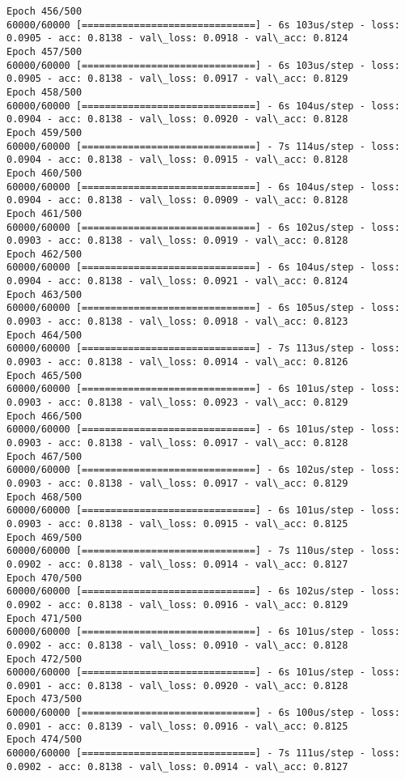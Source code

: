 \documentclass[11pt]{article}
\begin{document}
\begin{Verbatim}[commandchars=\\\{\}]
Epoch 456/500
60000/60000 [==============================] - 6s 103us/step - loss: 0.0905 - acc: 0.8138 - val\_loss: 0.0918 - val\_acc: 0.8124
Epoch 457/500
60000/60000 [==============================] - 6s 103us/step - loss: 0.0905 - acc: 0.8138 - val\_loss: 0.0917 - val\_acc: 0.8129
Epoch 458/500
60000/60000 [==============================] - 6s 104us/step - loss: 0.0904 - acc: 0.8138 - val\_loss: 0.0920 - val\_acc: 0.8128
Epoch 459/500
60000/60000 [==============================] - 7s 114us/step - loss: 0.0904 - acc: 0.8138 - val\_loss: 0.0915 - val\_acc: 0.8128
Epoch 460/500
60000/60000 [==============================] - 6s 104us/step - loss: 0.0904 - acc: 0.8138 - val\_loss: 0.0909 - val\_acc: 0.8128
Epoch 461/500
60000/60000 [==============================] - 6s 102us/step - loss: 0.0903 - acc: 0.8138 - val\_loss: 0.0919 - val\_acc: 0.8128
Epoch 462/500
60000/60000 [==============================] - 6s 104us/step - loss: 0.0904 - acc: 0.8138 - val\_loss: 0.0921 - val\_acc: 0.8124
Epoch 463/500
60000/60000 [==============================] - 6s 105us/step - loss: 0.0903 - acc: 0.8138 - val\_loss: 0.0918 - val\_acc: 0.8123
Epoch 464/500
60000/60000 [==============================] - 7s 113us/step - loss: 0.0903 - acc: 0.8138 - val\_loss: 0.0914 - val\_acc: 0.8126
Epoch 465/500
60000/60000 [==============================] - 6s 101us/step - loss: 0.0903 - acc: 0.8138 - val\_loss: 0.0923 - val\_acc: 0.8129
Epoch 466/500
60000/60000 [==============================] - 6s 101us/step - loss: 0.0903 - acc: 0.8138 - val\_loss: 0.0917 - val\_acc: 0.8128
Epoch 467/500
60000/60000 [==============================] - 6s 102us/step - loss: 0.0903 - acc: 0.8138 - val\_loss: 0.0917 - val\_acc: 0.8129
Epoch 468/500
60000/60000 [==============================] - 6s 101us/step - loss: 0.0903 - acc: 0.8138 - val\_loss: 0.0915 - val\_acc: 0.8125
Epoch 469/500
60000/60000 [==============================] - 7s 110us/step - loss: 0.0902 - acc: 0.8138 - val\_loss: 0.0914 - val\_acc: 0.8127
Epoch 470/500
60000/60000 [==============================] - 6s 102us/step - loss: 0.0902 - acc: 0.8138 - val\_loss: 0.0916 - val\_acc: 0.8129
Epoch 471/500
60000/60000 [==============================] - 6s 101us/step - loss: 0.0902 - acc: 0.8138 - val\_loss: 0.0910 - val\_acc: 0.8128
Epoch 472/500
60000/60000 [==============================] - 6s 101us/step - loss: 0.0901 - acc: 0.8138 - val\_loss: 0.0920 - val\_acc: 0.8128
Epoch 473/500
60000/60000 [==============================] - 6s 100us/step - loss: 0.0901 - acc: 0.8139 - val\_loss: 0.0916 - val\_acc: 0.8125
Epoch 474/500
60000/60000 [==============================] - 7s 111us/step - loss: 0.0902 - acc: 0.8138 - val\_loss: 0.0914 - val\_acc: 0.8127

\end{Verbatim}
\end{document}
